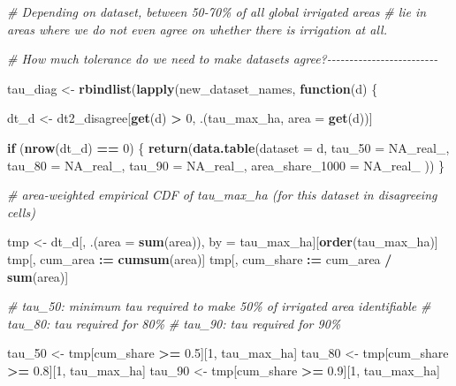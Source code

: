 \documentclass[
  11pt,
]{article}
\newenvironment{Shaded}{\begin{snugshade}}{\end{snugshade}}
\newcommand{\AttributeTok}[1]{\textcolor[rgb]{0.13,0.29,0.53}{#1}}
\newcommand{\CommentTok}[1]{\textcolor[rgb]{0.56,0.35,0.01}{\textit{#1}}}
\newcommand{\ConstantTok}[1]{\textcolor[rgb]{0.56,0.35,0.01}{#1}}
\newcommand{\ControlFlowTok}[1]{\textcolor[rgb]{0.13,0.29,0.53}{\textbf{#1}}}
\newcommand{\DecValTok}[1]{\textcolor[rgb]{0.00,0.00,0.81}{#1}}
\newcommand{\FloatTok}[1]{\textcolor[rgb]{0.00,0.00,0.81}{#1}}
\newcommand{\FunctionTok}[1]{\textcolor[rgb]{0.13,0.29,0.53}{\textbf{#1}}}
\newcommand{\NormalTok}[1]{#1}
\newcommand{\OtherTok}[1]{\textcolor[rgb]{0.56,0.35,0.01}{#1}}
\newcommand{\SpecialCharTok}[1]{\textcolor[rgb]{0.81,0.36,0.00}{\textbf{#1}}}
\begin{document}
\begin{Shaded}
\begin{Highlighting}[]
\CommentTok{\# Depending on dataset, between 50{-}70\% of all global irrigated areas}
\CommentTok{\# lie in areas where we do not even agree on whether there is irrigation at all.}

\CommentTok{\# How much tolerance do we need to make datasets agree?{-}{-}{-}{-}{-}{-}{-}{-}{-}{-}{-}{-}{-}{-}{-}{-}{-}{-}{-}{-}{-}{-}{-}{-}{-}}

\NormalTok{tau\_diag }\OtherTok{\textless{}{-}} \FunctionTok{rbindlist}\NormalTok{(}\FunctionTok{lapply}\NormalTok{(new\_dataset\_names, }\ControlFlowTok{function}\NormalTok{(d) \{}

\NormalTok{  dt\_d }\OtherTok{\textless{}{-}}\NormalTok{ dt2\_disagree[}\FunctionTok{get}\NormalTok{(d) }\SpecialCharTok{\textgreater{}} \DecValTok{0}\NormalTok{, .(tau\_max\_ha, }\AttributeTok{area =} \FunctionTok{get}\NormalTok{(d))]}

  \ControlFlowTok{if}\NormalTok{ (}\FunctionTok{nrow}\NormalTok{(dt\_d) }\SpecialCharTok{==} \DecValTok{0}\NormalTok{) \{}
    \FunctionTok{return}\NormalTok{(}\FunctionTok{data.table}\NormalTok{(}\AttributeTok{dataset =}\NormalTok{ d,}
                      \AttributeTok{tau\_50 =} \ConstantTok{NA\_real\_}\NormalTok{,}
                      \AttributeTok{tau\_80 =} \ConstantTok{NA\_real\_}\NormalTok{,}
                      \AttributeTok{tau\_90 =} \ConstantTok{NA\_real\_}\NormalTok{,}
                      \AttributeTok{area\_share\_1000 =} \ConstantTok{NA\_real\_}\NormalTok{  ))}
\NormalTok{  \}}

  \CommentTok{\# area{-}weighted empirical CDF of tau\_max\_ha (for this dataset in disagreeing cells)}

\NormalTok{  tmp }\OtherTok{\textless{}{-}}\NormalTok{ dt\_d[, .(}\AttributeTok{area =} \FunctionTok{sum}\NormalTok{(area)), by }\OtherTok{=}\NormalTok{ tau\_max\_ha][}\FunctionTok{order}\NormalTok{(tau\_max\_ha)]}
\NormalTok{  tmp[, cum\_area  }\SpecialCharTok{:=} \FunctionTok{cumsum}\NormalTok{(area)]}
\NormalTok{  tmp[, cum\_share }\SpecialCharTok{:=}\NormalTok{ cum\_area }\SpecialCharTok{/} \FunctionTok{sum}\NormalTok{(area)]}

  \CommentTok{\# tau\_50: minimum tau required to make 50\% of irrigated area identifiable}
  \CommentTok{\# tau\_80: tau required for 80\%}
  \CommentTok{\# tau\_90: tau required for 90\%}

\NormalTok{  tau\_50 }\OtherTok{\textless{}{-}}\NormalTok{ tmp[cum\_share }\SpecialCharTok{\textgreater{}=} \FloatTok{0.5}\NormalTok{][}\DecValTok{1}\NormalTok{, tau\_max\_ha]}
\NormalTok{  tau\_80 }\OtherTok{\textless{}{-}}\NormalTok{ tmp[cum\_share }\SpecialCharTok{\textgreater{}=} \FloatTok{0.8}\NormalTok{][}\DecValTok{1}\NormalTok{, tau\_max\_ha]}
\NormalTok{  tau\_90 }\OtherTok{\textless{}{-}}\NormalTok{ tmp[cum\_share }\SpecialCharTok{\textgreater{}=} \FloatTok{0.9}\NormalTok{][}\DecValTok{1}\NormalTok{, tau\_max\_ha]}


\end{Highlighting}
\end{Shaded}
\end{document}
